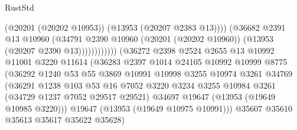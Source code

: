 \begin{lexlean}{RustStd}
\begin{coremodule}
                                              (@20201 (@20202 @10953))
                                              (@13953 (@20207 @2383 @13))))
                                          (@36682
                                            @2391
                                            @13
                                            @10960
                                            (@34791
                                              @2390
                                              @10960
                                              (@20201 (@20202 @10960))
                                              (@13953 (@20207 @2390 @13))))))))))))
                          (@36272
                            @2398
                            @2524
                            @2655
                            @13
                            @10992
                            @11001
                            @3220
                            @11614
                            (@36283
                              @2397
                              @1014
                              @24105
                              @10992
                              @10999
                              @8775
                              (@36292
                                @1240
                                @53
                                @55
                                @3869
                                @10991
                                @10998
                                @3255
                                @10974
                                @3261
                                @34769
                                (@36291
                                  @1238
                                  @103
                                  @53
                                  @16
                                  @7052
                                  @3220
                                  @3234
                                  @3255
                                  @10984
                                  @3261
                                  (@34729 @1237 @7052 @29517 @29521)
                                  @34697
                                  @19647
                                  (@13953 (@19649 @10985 @3220)))
                                @19647
                                (@13953 (@19649 @10975 @10991)))
                              @35607
                              @35610
                              @35613
                              @35617
                              @35622
                              @35628)

\end{coremodule}
\end{lexlean}
